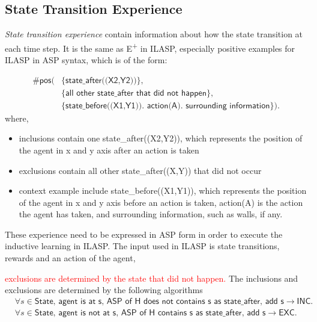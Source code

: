 \subsection{State Transition Experience}
\textit{State transition experience} contain information about how the state transition at each time step.
 It is the same as E\textsuperscript{+} in ILASP, especially positive examples for ILASP in ASP syntax, which is of the form:

\begin{equation}
\begin{split}
\textsf{\#pos(} & \textsf{\{state\_after((X2,Y2))\}},\\
& \{\textsf{all other state\_after that did not happen}\}, \\
& \{\textsf{state\_before((X1,Y1)). action(A). surrounding information}\}).
\end{split}
\end{equation}
where,
\begin{itemize}
    \item inclusions contain one state\_after((X2,Y2)), which represents the position of the agent in x and y axis after an action is taken 
    \item exclusions contain all other state\_after((X,Y)) that did not occur
    \item context example include state\_before((X1,Y1)), which represents the position of the agent in x and y axis before an action is taken,
    action(A) is the action the agent has taken, and surrounding information, such as walls, if any. 
\end{itemize}

These experience need to be expressed in ASP form in order to execute the inductive learning in ILASP. The input used in ILASP is state transitions, 
rewards and an action of the agent, 

\textcolor{red}{exclusions are determined by the state that did not happen.}
The inclusions and exclusions are determined by the following algorithms
\begin{equation*}
\begin{split}
    &\forall s \in \textsf{State, agent is at s, ASP of H does not contains s as state\_after, add s} \rightarrow \textsf{INC.} \\
    & \forall s \in \textsf{State, agent is not at s, ASP of H contains s as state\_after, add s} \rightarrow \textsf{EXC.} 
\end{split}
\end{equation*}

